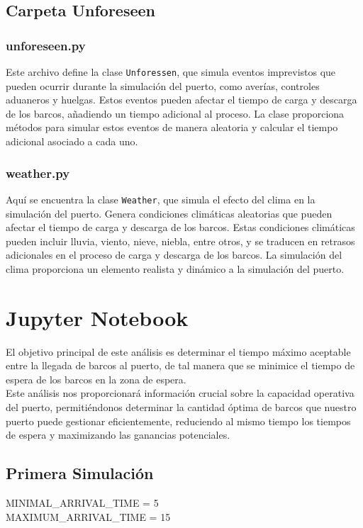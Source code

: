 \documentclass[12pt]{article}
\begin{document}
    \subsection{Carpeta Unforeseen}
        \subsubsection{unforeseen.py}
        Este archivo define la clase \texttt{Unforessen}, que simula eventos imprevistos que pueden ocurrir durante la simulación del puerto, como averías, controles aduaneros y huelgas. Estos eventos pueden afectar el tiempo de carga y descarga de los barcos, añadiendo un tiempo adicional al proceso. La clase proporciona métodos para simular estos eventos de manera aleatoria y calcular el tiempo adicional asociado a cada uno.

        \subsubsection{weather.py}
        Aquí se encuentra la clase \texttt{Weather}, que simula el efecto del clima en la simulación del puerto. Genera condiciones climáticas aleatorias que pueden afectar el tiempo de carga y descarga de los barcos. Estas condiciones climáticas pueden incluir lluvia, viento, nieve, niebla, entre otros, y se traducen en retrasos adicionales en el proceso de carga y descarga de los barcos. La simulación del clima proporciona un elemento realista y dinámico a la simulación del puerto.


\section{Jupyter Notebook}

El objetivo principal de este análisis es determinar el tiempo máximo aceptable entre la llegada de barcos al puerto, de tal manera que se minimice el tiempo de espera de los barcos en la zona de espera. \\

Este análisis nos proporcionará información crucial sobre la capacidad operativa del puerto, permitiéndonos determinar la cantidad óptima de barcos que nuestro puerto puede gestionar eficientemente, reduciendo al mismo tiempo los tiempos de espera y maximizando las ganancias potenciales.

    \subsection{Primera Simulación}
    MINIMAL\_ARRIVAL\_TIME = 5 \\
    MAXIMUM\_ARRIVAL\_TIME = 15 \\
\end{document}
